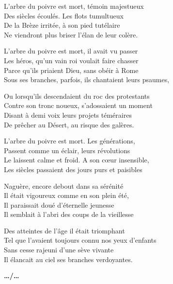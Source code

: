 \begin{center}
\begin{minipage}{0.55\textwidth}
L’arbre du poivre est mort, témoin majestueux\\
Des siècles écoulés. Les flots tumultueux\\
De la Brèze irritée, à son pied tutélaire\\
Ne viendront plus briser l’élan de leur colère.

\vspace{0.35cm}

L’arbre du poivre est mort, il avait vu passer\\
Les héros, qu’un vain roi voulait faire chasser\\
Parce qu’ils priaient Dieu, sans obéir à Rome\\
Sous ses branches, parfois, ils chantaient leurs psaumes,

\vspace{0.35cm}

Ou lorsqu’ils descendaient du roc des protestants\\
Contre son tronc noueux, s’adossaient un moment\\
Disant à demi voix leurs projets téméraires\\
De prêcher au Désert, au risque des galères.

\vspace{0.35cm}

L’arbre du poivre est mort. Les générations,\\
Passent comme un éclair, leurs révolutions\\
Le laissent calme et froid. A son cœur insensible,\\
Les siècles passaient des jours purs et paisibles

\vspace{0.35cm}

Naguère, encore debout dans sa sérénité\\
Il était vigoureux comme en son plein été,\\
Il paraissait doué d’éternelle jeunesse\\
Il semblait à l’abri des coups de la vieillesse

\vspace{0.35cm}

Des atteintes de l’âge il était triomphant\\
Tel que l’avaient toujours connu nos yeux d’enfants\\
Sans cesse rajeuni d’une sève vivante\\
Il élancait au ciel ses branches verdoyantes.
\end{minipage}
\end{center}

\vfill

\begin{flushright}
\textbf{…/…}
\end{flushright}
